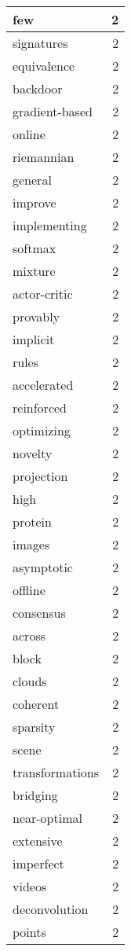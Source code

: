 \begin{table}[h]
\begin{tabular}{|l|r|}
\hline
few & 2 \\
\hline
signatures & 2 \\
\hline
equivalence & 2 \\
\hline
backdoor & 2 \\
\hline
gradient-based & 2 \\
\hline
online & 2 \\
\hline
riemannian & 2 \\
\hline
general & 2 \\
\hline
improve & 2 \\
\hline
implementing & 2 \\
\hline
softmax & 2 \\
\hline
mixture & 2 \\
\hline
actor-critic & 2 \\
\hline
provably & 2 \\
\hline
implicit & 2 \\
\hline
rules & 2 \\
\hline
accelerated & 2 \\
\hline
reinforced & 2 \\
\hline
optimizing & 2 \\
\hline
novelty & 2 \\
\hline
projection & 2 \\
\hline
high & 2 \\
\hline
protein & 2 \\
\hline
images & 2 \\
\hline
asymptotic & 2 \\
\hline
offline & 2 \\
\hline
consensus & 2 \\
\hline
across & 2 \\
\hline
block & 2 \\
\hline
clouds & 2 \\
\hline
coherent & 2 \\
\hline
sparsity & 2 \\
\hline
scene & 2 \\
\hline
transformations & 2 \\
\hline
bridging & 2 \\
\hline
near-optimal & 2 \\
\hline
extensive & 2 \\
\hline
imperfect & 2 \\
\hline
videos & 2 \\
\hline
deconvolution & 2 \\
\hline
points & 2 \\
\hline

\end{tabular}
\end{table}
